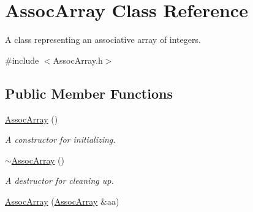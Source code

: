 \hypertarget{class_assoc_array}{\section{Assoc\-Array Class Reference}
\label{class_assoc_array}
}


A class representing an associative array of integers.  




{\ttfamily \#include $<$Assoc\-Array.\-h$>$}

\subsection*{Public Member Functions}
\begin{DoxyCompactItemize}
\item 
\hypertarget{class_assoc_array_a9f50d528fb34e77022df902a99b480c9}{\hyperlink{class_assoc_array_a9f50d528fb34e77022df902a99b480c9}{Assoc\-Array} ()}\label{class_assoc_array_a9f50d528fb34e77022df902a99b480c9}

\begin{DoxyCompactList}\small\item\em A constructor for initializing. \end{DoxyCompactList}\item 
\hypertarget{class_assoc_array_a205392576404e78c4fcfa5156c849c6e}{\hyperlink{class_assoc_array_a205392576404e78c4fcfa5156c849c6e}{$\sim$\-Assoc\-Array} ()}\label{class_assoc_array_a205392576404e78c4fcfa5156c849c6e}

\begin{DoxyCompactList}\small\item\em A destructor for cleaning up. \end{DoxyCompactList}\item 
\hypertarget{class_assoc_array_a393c0c4d86713f1721e665fe05f60473}{\hyperlink{class_assoc_array_a393c0c4d86713f1721e665fe05f60473}{Assoc\-Array} (\hyperlink{class_assoc_array}{Assoc\-Array} \&aa)}\label{class_assoc_array_a393c0c4d86713f1721e665fe05f60473}


\end{DoxyCompactItemize}
